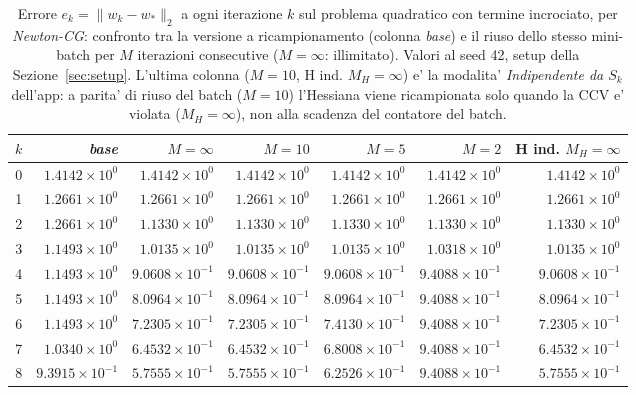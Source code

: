 \begin{table}[H]
\centering
\footnotesize
\renewcommand{\arraystretch}{0.85}
\setlength{\tabcolsep}{2pt}
\caption{Errore $e_k=\|w_k-w_*\|_2$ a ogni iterazione $k$ sul problema quadratico con termine incrociato, per \emph{Newton-CG}: confronto tra la versione a ricampionamento (colonna \emph{base}) e il riuso dello stesso mini-batch per $M$ iterazioni consecutive ($M=\infty$: illimitato). Valori al seed 42, setup della Sezione~\ref{sec:setup}. L'ultima colonna ($M{=}10$, H ind. $M_H{=}\infty$) e' la modalita' \emph{Indipendente da $S_k$} dell'app: a parita' di riuso del batch ($M=10$) l'Hessiana viene ricampionata solo quando la CCV e' violata ($M_H=\infty$), non alla scadenza del contatore del batch.}
\label{tab:riuso_offdiag_ncg}
\begin{tabular}{@{}rrrrrrr@{}}
\toprule
$k$ & \emph{base} & $M{=}\infty$ & $M{=}10$ & $M{=}5$ & $M{=}2$ & H ind. $M_H{=}\infty$\\
\midrule
0 & $1.4142\times10^{0}$ & $1.4142\times10^{0}$ & $1.4142\times10^{0}$ & $1.4142\times10^{0}$ & $1.4142\times10^{0}$ & $1.4142\times10^{0}$\\
1 & $1.2661\times10^{0}$ & $1.2661\times10^{0}$ & $1.2661\times10^{0}$ & $1.2661\times10^{0}$ & $1.2661\times10^{0}$ & $1.2661\times10^{0}$\\
2 & $1.2661\times10^{0}$ & $1.1330\times10^{0}$ & $1.1330\times10^{0}$ & $1.1330\times10^{0}$ & $1.1330\times10^{0}$ & $1.1330\times10^{0}$\\
3 & $1.1493\times10^{0}$ & $1.0135\times10^{0}$ & $1.0135\times10^{0}$ & $1.0135\times10^{0}$ & $1.0318\times10^{0}$ & $1.0135\times10^{0}$\\
4 & $1.1493\times10^{0}$ & $9.0608\times10^{-1}$ & $9.0608\times10^{-1}$ & $9.0608\times10^{-1}$ & $9.4088\times10^{-1}$ & $9.0608\times10^{-1}$\\
5 & $1.1493\times10^{0}$ & $8.0964\times10^{-1}$ & $8.0964\times10^{-1}$ & $8.0964\times10^{-1}$ & $9.4088\times10^{-1}$ & $8.0964\times10^{-1}$\\
6 & $1.1493\times10^{0}$ & $7.2305\times10^{-1}$ & $7.2305\times10^{-1}$ & $7.4130\times10^{-1}$ & $9.4088\times10^{-1}$ & $7.2305\times10^{-1}$\\
7 & $1.0340\times10^{0}$ & $6.4532\times10^{-1}$ & $6.4532\times10^{-1}$ & $6.8008\times10^{-1}$ & $9.4088\times10^{-1}$ & $6.4532\times10^{-1}$\\
8 & $9.3915\times10^{-1}$ & $5.7555\times10^{-1}$ & $5.7555\times10^{-1}$ & $6.2526\times10^{-1}$ & $9.4088\times10^{-1}$ & $5.7555\times10^{-1}$\\

\end{tabular}
\end{table}
